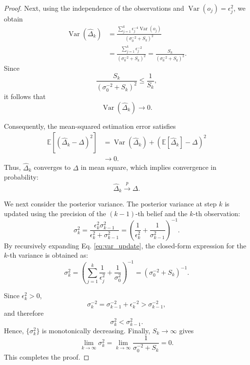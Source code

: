 \documentclass[letterpaper,10pt,onecolumn]{IEEEtran}
\begin{document}
\begin{proof}
Next, using the independence of the observations and
$\operatorname{Var}(o_j)=\epsilon_j^2$, we obtain
\begin{align*}
\operatorname{Var}(\hat{\Delta}_k)
&=
\frac{
\sum_{j=1}^{k}
\epsilon_j^{-4}\operatorname{Var}(o_j)
}{
(\sigma_0^{-2}+S_k)^2
}\\
&=
\frac{
\sum_{j=1}^{k}\epsilon_j^{-2}
}{
(\sigma_0^{-2}+S_k)^2
}
=
\frac{S_k}{(\sigma_0^{-2}+S_k)^2}.
\end{align*}
Since
\[
\frac{S_k}{(\sigma_0^{-2}+S_k)^2}
\leq
\frac{1}{S_k},
\]
it follows that
\[
\operatorname{Var}(\hat{\Delta}_k)\rightarrow 0.
\]

Consequently, the mean-squared estimation error satisfies
\begin{align*}
\mathbb{E}\!\left[
(\hat{\Delta}_k-\Delta)^2
\right]
&=
\operatorname{Var}(\hat{\Delta}_k)
+
\left(
\mathbb{E}[\hat{\Delta}_k]-\Delta
\right)^2
\\
&\rightarrow 0.
\end{align*}
Thus, $\hat{\Delta}_k$ converges to $\Delta$ in mean square, which
implies convergence in probability:
\[
\hat{\Delta}_k \xrightarrow{p} \Delta.
\]

We next consider the posterior variance.
The posterior variance at step $k$ is updated using the precision of the $(k-1)$-th belief and the $k$-th observation:
\begin{equation}
\sigma_k^2 = \frac{\epsilon_k^2 \sigma_{k-1}^2}{\epsilon_k^2 + \sigma_{k-1}^2} = \left( \frac{1}{\epsilon_k^2} + \frac{1}{\sigma_{k-1}^2} \right)^{-1}. \label{eq:var_update}
\end{equation}
By recursively expanding Eq. \eqref{eq:var_update}, the closed-form expression for the $k$-th variance is obtained as:
\begin{equation*}
\sigma_k^2 = \left( \sum_{j=1}^k \frac{1}{\epsilon_j^2} + \frac{1}{\sigma_0^2} \right)^{-1}=\left(
\sigma_0^{-2}+S_k
\right)^{-1}. \label{eq:var_closed}
\end{equation*}

Since $\epsilon_k^2>0$,
\[
\sigma_k^{-2}
=
\sigma_{k-1}^{-2}+\epsilon_k^{-2}
>
\sigma_{k-1}^{-2},
\]
and therefore
\[
\sigma_k^2<\sigma_{k-1}^2.
\]
Hence, $\{\sigma_k^2\}$ is monotonically decreasing. Finally,
$S_k\rightarrow\infty$ gives
\[
\lim_{k\rightarrow\infty}\sigma_k^2
=
\lim_{k\rightarrow\infty}
\frac{1}{\sigma_0^{-2}+S_k}
=0.
\]
This completes the proof.
\end{proof}
\end{document}
